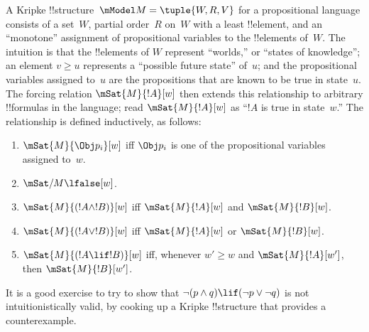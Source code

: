 \documentclass[../../../include/open-logic-section]{subfiles}
\begin{document}
A Kripke !!{structure}~$\mModel M = \tuple{W, R, V}$ for a propositional
language consists of a set~$W$, partial order~$R$ on~$W$ with a least
!!{element}, and an ``monotone'' assignment of propositional variables to
the !!{element}s of~$W$. The intuition is that the !!{element}s of $W$
represent ``worlds,'' or ``states of knowledge''; an element $v \geq
u$ represents a ``possible future state'' of~$u$; and the
propositional variables assigned to~$u$ are the propositions that are
known to be true in state~$u$. The forcing relation $\mSat{M}{!A}[w]$
then extends this relationship to arbitrary !!{formula}s in the
language; read $\mSat{M}{!A}[w]$ as ``$!A$ is true in state~$w$.'' The
relationship is defined inductively, as follows:
\begin{enumerate}
\item $\mSat{M}{\Obj p_i}[w]$ iff $\Obj p_i$ is one of the
  propositional variables assigned to~$w$.
\item $\mSat/{M}{\lfalse}[w]$.
\item $\mSat{M}{(!A \land !B)}[w]$ iff $\mSat{M}{!A}[w]$ and $\mSat{M}{!B}[w]$.
\item $\mSat{M}{(!A \lor !B)}[w]$ iff $\mSat{M}{!A}[w]$ or $\mSat{M}{!B}[w]$.
\item $\mSat{M}{(!A \lif !B)}[w]$ iff, whenever $w' \geq w$ and
  $\mSat{M}{!A}[w']$, then $\mSat{M}{!B}[w']$.
\end{enumerate}
It is a good exercise to try to show that $\lnot (p \land q) \lif
(\lnot p \lor \lnot q)$ is not intuitionistically valid, by cooking up a
Kripke !!{structure} that provides a counterexample.
\end{document}
